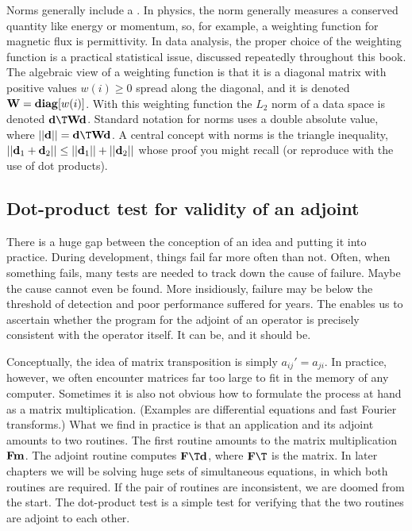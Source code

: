 \par
Norms generally include a .
In physics,
the norm generally measures a conserved quantity
like energy or momentum,
so, for example,
a weighting function for magnetic flux is permittivity.
In data analysis,
the proper choice of the weighting function is
a practical statistical issue,
discussed repeatedly throughout this book.
The algebraic view of a weighting function is that
it is a diagonal matrix
with positive values $w(i)\ge 0$ spread along the diagonal,
and it is denoted $\bold W = {\bf diag}[w(i)]$.
With this weighting function
the $L_2$ norm of a data space is denoted
$\bold d\T \bold W \bold d$.
Standard notation for norms uses a double absolute value,
where $||\bold d||=\bold d\T \bold W \bold d$.
A central concept with norms is the triangle inequality,
$ ||\bold d_1   +   \bold d_2|| \le ||\bold d_1|| + ||\bold d_2|| $
whose proof you might recall (or reproduce with the use of dot products).

\subsection{Dot-product test for validity of an adjoint}
\par
There is a huge gap between the
conception of an idea and putting it into practice.
During development, things fail far more often than not.
Often, when something fails,
many tests are needed to track down the cause of failure.
Maybe the cause cannot even be found.
More insidiously, failure may be below the threshold of detection
and poor performance suffered for years.
The 
enables us to ascertain whether
the program for the adjoint of an operator
is precisely consistent with the operator itself.
It can be, and it should be.

\par
Conceptually, the idea of matrix transposition is simply ${a}_{ij}'=a_{ji}$.
In practice, however, we often encounter matrices far too large
to fit in the memory of any computer.
Sometimes it is also not obvious how to formulate the process at hand
as a matrix multiplication.
(Examples are differential equations and fast Fourier transforms.)
What we find in practice is that an application and its adjoint 
amounts to two routines. The first routine
amounts to the matrix multiplication $ \bold F \bold m$.
The adjoint routine computes $\bold F\T \bold d$,
where $\bold F\T$ is the  matrix.
In later chapters we will be solving huge sets of simultaneous equations,
in which both routines are required.
If the pair of routines are inconsistent,
we are doomed from the start.
The dot-product test is a simple test for verifying that the two 
routines are adjoint to each other.

